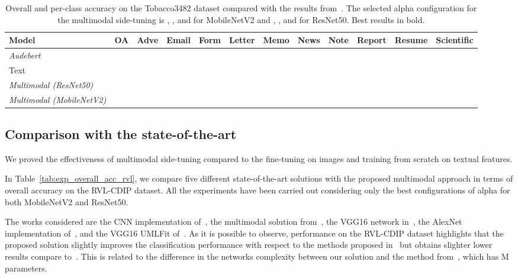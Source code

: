 \begin{table*}[ht]
    \caption{Overall and per-class accuracy on the Tobacco3482 dataset compared with the results from~\cite{audebert}. The selected alpha configuration  for the multimodal side-tuning is , , and  for MobileNetV2 and , , and  for ResNet50. Best results in bold.}\label{tab:exp_tobacco_class}
    \centering
    \begin{tabular}{lccccccccccc}
        \toprule
        \bfseries Model & \bfseries OA & \bfseries Adve & \bfseries Email & \bfseries Form & \bfseries Letter & \bfseries Memo & \bfseries News & \bfseries Note & \bfseries Report & \bfseries Resume & \bfseries Scientific\\
        \midrule
        \textit{Audebert} &  &  &  &  &  &  &  &  &  &  &  \\
        \midrule
Text &  &  &  &  &  &  &  &  &  &  &  \\
        \textit{Multimodal (ResNet50)} &  &  &  &  &  &  &  &  &  &  &  \\
        \textit{Multimodal (MobileNetV2)} &  &  &  &  &  &  &  &  &  &  &  \\
        \bottomrule
    \end{tabular}
\end{table*}

\subsection{Comparison with the state-of-the-art}
We proved the effectiveness of multimodal side-tuning compared to the fine-tuning on images and training from scratch on textual features.

In Table~\ref{tab:exp_overall_acc_rvl}, we compare five different state-of-the-art solutions with the proposed multimodal approach in terms of  overall accuracy on the RVL-CDIP dataset.
All the experiments have been carried out considering only the best configurations of alpha for both MobileNetV2 and ResNet50.

The works considered are the CNN implementation of~\cite{7333910}, the multimodal solution from~\cite{audebert}, the VGG16 network in~\cite{8270080}, the AlexNet implementation of~\cite{8270002}, and the VGG16  UMLFit of~\cite{8977998}. 
As it is possible to observe, performance on the RVL-CDIP dataset highlights that the proposed solution slightly improves the classification performance with respect to the methods proposed in~\cite{7333910,audebert,8270080,8270002} but obtains slighter lower results compare to~\cite{8977998}.
This is related to the difference in the networks complexity between our solution and the method from~\cite{8977998}, which has M parameters.

